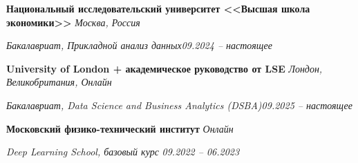 
\textbf{Национальный исследовательский университет <<Высшая школа экономики>>} \hfill \emph{Москва, Россия}

\textit{Бакалавриат, Прикладной анализ данных}\hfill \emph{09.2024 -- настоящее}\vspace{0.12cm}
	
\textbf{University of London + академическое руководство от LSE} \hfill \emph{Лондон, Великобритания, Онлайн}

\textit{Бакалавриат, Data Science and Business Analytics (DSBA)}\hfill \emph{09.2025 -- настоящее}\vspace{0.12cm}
	
\textbf{Московский физико-технический институт} \hfill \emph{Онлайн}
	
\textit{Deep Learning School, базовый курс} \hfill \emph{09.2022 -- 06.2023}
